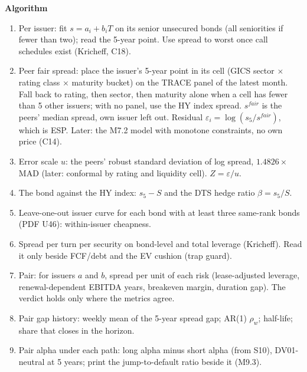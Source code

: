 \documentclass[11pt]{article}
\newcommand{\fld}[1]{\par\medskip\noindent\textbf{\textcolor{steel}{#1}}\par\nopagebreak}
\begin{document}
\fld{Algorithm}
\begin{algobox}
\begin{enumerate}
\item Per issuer: fit $s = a_i + b_i T$ on its senior unsecured bonds (all seniorities if fewer than two); read the 5-year point. Use spread to worst once call schedules exist (Kricheff, C18).
\item Peer fair spread: place the issuer's 5-year point in its cell (GICS sector $\times$ rating class $\times$ maturity bucket) on the TRACE panel of the latest month. Fall back to rating, then sector, then maturity alone when a cell has fewer than 5 other issuers; with no panel, use the HY index spread. $s^{fair}$ is the peers' median spread, own issuer left out. Residual $\varepsilon_i = \log(s_5/s^{fair})$, which is ESP. Later: the M7.2 model with monotone constraints, no own price (C14).
\item Error scale $u$: the peers' robust standard deviation of log spread, $1.4826\times$MAD (later: conformal by rating and liquidity cell). $Z = \varepsilon / u$.
\item The bond against the HY index: $s_5 - S$ and the DTS hedge ratio $\beta = s_5/S$.
\item Leave-one-out issuer curve for each bond with at least three same-rank bonds (PDF U46): within-issuer cheapness.
\item Spread per turn per security on bond-level and total leverage (Kricheff). Read it only beside FCF/debt and the EV cushion (trap guard).
\item Pair: for issuers $a$ and $b$, spread per unit of each risk (lease-adjusted leverage, renewal-dependent EBITDA years, breakeven margin, duration gap). The verdict holds only where the metrics agree.
\item Pair gap history: weekly mean of the 5-year spread gap; AR(1) $\rho_w$; half-life; share that closes in the horizon.
\item Pair alpha under each path: long alpha minus short alpha (from S10), DV01-neutral at 5 years; print the jump-to-default ratio beside it (M9.3).
\end{enumerate}
\end{algobox}
\end{document}
